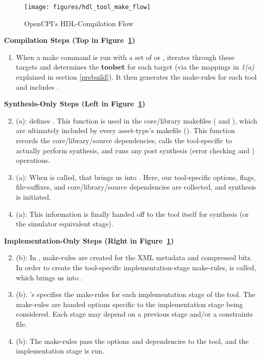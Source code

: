 \begin{figure}[H]
	\centerline{\texttt{[image: figures/hdl\_tool\_make\_flow]}}
	\caption{OpenCPI's HDL-Compilation Flow}
	\label{fig:flowdiag}
\end{figure}

\textbf{Compilation Steps (Top in Figure~\ref{fig:flowdiag})}
\begin{enumerate}
\item When a make command is run with a set of  or ,  iterates through these targets and determines the \textbf{toolset} for each target (via the mappings in \textit{1(a)}  explained in section \ref{prebuild}). It then generates the make-rules for each tool and includes .
\end{enumerate}
\textbf{Synthesis-Only Steps (Left in Figure~\ref{fig:flowdiag})}
\begin{enumerate}
\setcounter{enumi}{1}
\item (a):  defines . This function is used  in the core/library makefiles ( and ), which are ultimately included by every asset-type's makefile (). This function records the core/library/source dependencies, calls the tool-specific  to actually perform synthesis, and runs any post synthesis (error checking and ) operations.
\item (a): When  is called, that brings us into . Here, our tool-specific options, flags, file-suffixes, and core/library/source dependencies are collected, and synthesis is initiated.
\item (a): This information is finally handed off to the tool itself for synthesis (or the simulator equivalent stage).
\end{enumerate}
\textbf{Implementation-Only Steps (Right in Figure~\ref{fig:flowdiag})}
\begin{enumerate}
\setcounter{enumi}{1}
\item (b): In , make-rules are created for the XML metadata and compressed bitz. In order to create the tool-specific implementation-stage make-rules,  is called, which brings us into .
\item (b): 's  specifies the make-rules for each implementation stage of the tool. The make-rules are handed options specific to the implementation stage being considered. Each stage may depend on a previous stage and/or a constraints file.
\item (b): The make-rules pass the options and dependencies to the tool, and the implementation stage is run.
\end{enumerate}

